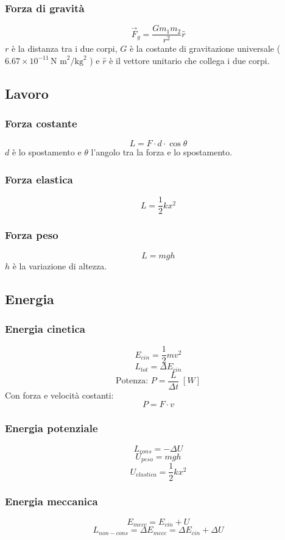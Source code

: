\documentclass[a4paper]{article}
\theoremstyle{break}
\theoremstyle{break}
\theoremstyle{break}
\theoremstyle{break}
\begin{document}
\subsubsection{Forza di gravità}
\[
  \vec{F}_g = \frac{G m_1 m_2}{r^2} \hat{r}
\]
\( r \) è la distanza tra i due corpi, \( G \) è la costante di gravitazione universale (\( 6.67 \times 10^{-11} \, \text{N m}^2 / \text{kg}^2 \) )
e \( \hat{r} \) è il vettore unitario che collega i due corpi.

\subsection{Lavoro}
\subsubsection{Forza costante}
\[
  L = F \cdot d \cdot \cos \theta
\] 
\( d \) è lo spostamento e \( \theta \) l'angolo tra la forza e lo spostamento. 

\subsubsection{Forza elastica}
\[
  L = \frac{1}{2} k x^2
\]

\subsubsection{Forza peso}
\[
L = mgh
\] 
\( h \) è la variazione di altezza.

\subsection{Energia}
\subsubsection{Energia cinetica}
\[
  E_{cin} = \frac{1}{2} m v^2
\] 
\[
  L_{tot} = \Delta E_{cin}
\] 
\[
  \text{Potenza: } P = \frac{L}{\Delta t}\; [W]
\] 
Con forza e velocità costanti:
\[
P = F \cdot v
\] 

\subsubsection{Energia potenziale}
\[
  L_{cons} = - \Delta U
\] 
\[
  U_{peso} = mgh
\]
\[
  U_{elastica} = \frac{1}{2} k x^2
\] 

\subsubsection{Energia meccanica}
\[
  E_{mecc} = E_{cin} + U
\]
\[
  L_{non-cons} = \Delta E_{mecc} = \Delta E_{cin} + \Delta U
\] 
\end{document}
